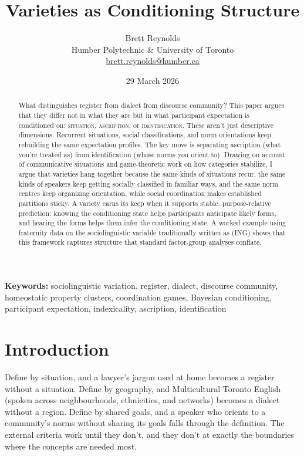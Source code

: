 \documentclass[11pt,letterpaper]{article}
\title{Varieties as Conditioning Structure}
\author{Brett Reynolds \orcidlink{0000-0003-0073-7195}\\
  Humber Polytechnic \& University of Toronto\\
  \href{mailto:brett.reynolds@humber.ca}{brett.reynolds@humber.ca}}
\date{29 March 2026}
\begin{document}
\maketitle

\begin{abstract}
What distinguishes register from dialect from discourse community? This paper argues that they differ not in what they are but in what participant expectation is conditioned on: \textsc{situation}, \textsc{ascription}, or \textsc{identification}. These aren't just descriptive dimensions. Recurrent situations, social classifications, and norm orientations keep rebuilding the same expectation profiles. The key move is separating ascription (what you're treated as) from identification (whose norms you orient to). Drawing on  account of communicative situations and  game-theoretic work on how categories stabilize, I argue that varieties hang together because the same kinds of situations recur, the same kinds of speakers keep getting socially classified in familiar ways, and the same norm centres keep organizing orientation, while social coordination makes established partitions sticky. A variety earns its keep when it supports stable, purpose-relative prediction: knowing the conditioning state helps participants anticipate likely forms, and hearing the forms helps them infer the conditioning state. A worked example using  fraternity data on the sociolinguistic variable traditionally written as (ING) shows that this framework captures structure that standard factor-group analyses conflate.
\end{abstract}

\medskip
\noindent\textbf{Keywords:} sociolinguistic variation, register, dialect, discourse community, homeostatic property clusters, coordination games, Bayesian conditioning, participant expectation, indexicality, ascription, identification

\section{Introduction}

Define  by situation, and a lawyer's jargon used at home becomes a register without a situation. Define  by geography, and Multicultural Toronto English (spoken across neighbourhoods, ethnicities, and networks) becomes a dialect without a region. Define  by shared goals, and a speaker who orients to a community's norms without sharing its goals falls through the definition. The external criteria work until they don't, and they don't at exactly the boundaries where the concepts are needed most.
\end{document}
